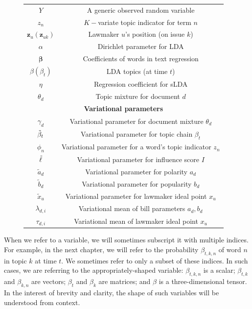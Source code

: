 \begin{figure}
\begin{center}
\begin{tabular}{|c|c|}
      $Y$ & A generic observed random variable \\
      $z_n$ & $K-$variate topic indicator for term $n$ \\
      $\bm z_u (\bm z_{uk})$ & Lawmaker $u$'s position (on issue $k$) \\
      $\alpha$ & Dirichlet parameter for LDA \\
      $\bm \beta$ & Coefficients of words in text regression \\
      $\beta (\beta_t)$ & LDA topics (at time $t$) \\
      $\eta$ & Regression coefficient for sLDA \\
      $\theta_d$ & Topic mixture for document $d$ \\
      \hline
      \multicolumn{2}{|c|}{\textbf{Variational parameters}} \\
      \hline
      $\gamma_d$ & Variational parameter for document mixture $\theta_d$ \\
      $\tilde{\beta}_t$ & Variational parameter for topic chain $\beta_t$ \\
      $\phi_n$ & Variational parameter for a word's topic indicator $z_n$ \\
      $\tilde{\ell}$ & Variational parameter for influence score $I$ \\
      $\tilde a_d$ & Variational parameter for polarity $a_d$ \\
      $\tilde b_d$ & Variational parameter for popularity $b_d$ \\
      $\tilde x_u$ & Variational parameter for lawmaker ideal point $x_u$ \\
      $\lambda_{d,i}$ & Variational mean of bill parameters $a_d, b_d$
      \\
      $\tau_{d,i}$ & Variational mean of lawmaker ideal point $x_u$ \\
      \hline
    \end{tabular}
  \end{center}
  \label{fig:notation}
\end{figure}
When we refer to a variable, we will sometimes subscript it with
multiple indices.  For example, in the next chapter, we will refer to
the probability $\beta_{t,k,n}$ of word $n$ in topic $k$ at time
$t$. We sometimes refer to only a subset of these indices. In such
cases, we are referring to the appropriately-shaped variable:
$\beta_{t,k,n}$ is a scalar; $\beta_{t,k}$ and $\beta_{k,n}$ are
vectors; $\beta_t$ and $\beta_k$ are matrices; and
$\beta$ is a three-dimensional tensor.  In the interest of brevity and
clarity, the shape of such variables will be understood from context.

